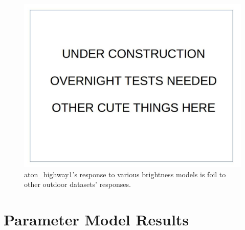 \documentclass[12pt]{report}
\begin{document}
\begin{figure}
\centering
  \includegraphics[width=.7\linewidth]{figures/placeholder.jpg}
\caption{aton\_highway1's response to various brightness models is foil to other outdoor datasets' responses.}
\label{fig:highway1_reciprocal}
\end{figure}

\section{Parameter Model Results}
\end{document}
